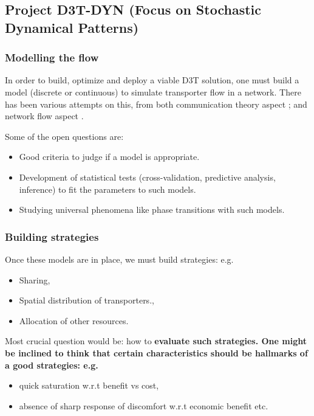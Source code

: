 \subsection*{Project D3T-DYN (Focus on Stochastic Dynamical Patterns)}

\subsubsection*{Modelling the flow}
In order to  build, optimize and deploy a viable D3T solution, one must build a model
(discrete or continuous) to simulate transporter flow in a network. There has been various attempts on this,
from both communication theory aspect \cite{zhang_communication_2011, arenas_communication_2001}; and network flow aspect
\cite{de_martino_minimal_2009,sole-ribalta_model_2016,tan_hybrid_2013}. 

Some of the open questions are:
\begin{itemize}
\item Good criteria to judge if a model is appropriate. 
\item Development of statistical tests (cross-validation, predictive analysis, inference) to fit the parameters to such models. 
\item Studying universal phenomena like phase transitions with such models.
\end{itemize}

\subsubsection*{Building strategies}
Once these models are in place, we must build strategies: e.g. 
\begin{itemize}
\item Sharing,
\item Spatial distribution of transporters.,
\item Allocation of other resources.
\end{itemize}

Most crucial question would be: how to \bf{evaluate} such strategies. One might be inclined to think that certain characteristics
should be hallmarks of a good strategies: e.g. 
\begin{itemize}
\item quick saturation w.r.t benefit vs cost,
\item absence of sharp response of discomfort w.r.t economic benefit etc.
\end{itemize}